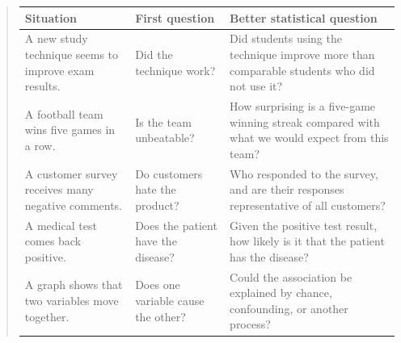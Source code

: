 \documentclass[
  letterpaper,
  DIV=11,
  numbers=noendperiod]{scrreprt}
\begin{document}
\begin{tcolorbox}
\begin{quote}
\begin{table}
\fontsize{12.0pt}{14.0pt}\selectfont
\begin{tabular*}{\linewidth}{@{\extracolsep{\fill}}lll}
\toprule
Situation & First question & Better statistical question \\ 
\midrule\addlinespace[2.5pt]
A new study technique seems to improve exam results. & Did the technique work? & Did students using the technique improve more than comparable students who did not use it? \\ 
A football team wins five games in a row. & Is the team unbeatable? & How surprising is a five-game winning streak compared with what we would expect from this team? \\ 
A customer survey receives many negative comments. & Do customers hate the product? & Who responded to the survey, and are their responses representative of all customers? \\ 
A medical test comes back positive. & Does the patient have the disease? & Given the positive test result, how likely is it that the patient has the disease? \\ 
A graph shows that two variables move together. & Does one variable cause the other? & Could the association be explained by chance, confounding, or another process? \\ 
\bottomrule
\end{tabular*}
\end{table}
\end{quote}

\end{tcolorbox}
\end{document}
